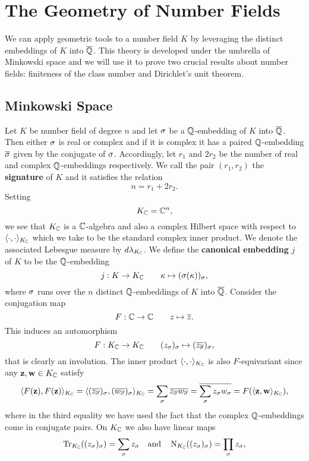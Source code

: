 \chapter{The Geometry of Number Fields}
  We can apply geometric tools to a number field $K$ by leveraging the distinct embeddings of $K$ into $\overline{\mathbb{Q}}$. This theory is developed under the umbrella of Minkowski space and we will use it to prove two crucial results about number fields: finiteness of the class number and Dirichlet's unit theorem.
  \section{Minkowski Space}
    Let $K$ be number field of degree $n$ and let $\sigma$ be a $\mathbb{Q}$-embedding of $K$ into $\overline{\mathbb{Q}}$. Then either $\sigma$ is real or complex and if it is complex it has a paired $\mathbb{Q}$-embedding $\overline{\sigma}$ given by the conjugate of $\sigma$. Accordingly, let $r_{1}$ and $2r_{2}$ be the number of real and complex $\mathbb{Q}$-embeddings respectively. We call the pair $(r_{1},r_{2})$ the \textbf{signature} of $K$ and it satisfies the relation
    \[
      n = r_{1}+2r_{2}.
    \]
    Setting
    \[
      K_{\mathbb{C}} = \mathbb{C}^{n},
    \]
    we see that $K_{\mathbb{C}}$ is a $\mathbb{C}$-algebra and also a complex Hilbert space with respect to $\langle\cdot,\cdot\rangle_{K_{\mathbb{C}}}$ which we take to be the standard complex inner product. We denote the associated Lebesgue measure by $d\lambda_{K_{\mathbb{C}}}$. We define the \textbf{canonical embedding} $j$ of $K$ to be the $\mathbb{Q}$-embedding
    \[
      j:K \to K_{\mathbb{C}} \qquad \kappa \mapsto (\sigma(\kappa))_{\sigma},
    \]
    where $\sigma$ runs over the $n$ distinct $\mathbb{Q}$-embeddings of $K$ into $\overline{\mathbb{Q}}$. Consider the conjugation map
    \[
      F:\mathbb{C} \to \mathbb{C} \qquad z \mapsto \overline{z}.
    \]
    This induces an automorphism
    \[
      F:K_{\mathbb{C}} \to K_{\mathbb{C}} \qquad (z_{\sigma})_{\sigma} \mapsto (\overline{z_{\overline{\sigma}}})_{\sigma},
    \]
    that is clearly an involution. The inner product $\langle\cdot,\cdot\rangle_{K_{\mathbb{C}}}$ is also $F$-equivariant since any $\mathbf{z},\mathbf{w} \in K_{\mathbb{C}}$ satisfy
    \[
      \langle F(\mathbf{z}),F(\mathbf{z})\rangle_{K_{\mathbb{C}}} = \langle(\overline{z_{\overline{\sigma}}})_{\sigma},(\overline{w_{\overline{\sigma}}})_{\sigma}\rangle_{K_{\mathbb{C}}} = \sum_{\sigma}\overline{z_{\overline{\sigma}}w_{\overline{\sigma}}} = \overline{\sum_{\sigma}z_{\sigma}w_{\sigma}} = F(\langle\mathbf{z},\mathbf{w}\rangle_{K_{\mathbb{C}}}),
    \]
    where in the third equality we have used the fact that the complex $\mathbb{Q}$-embeddings come in conjugate pairs. On $K_{\mathbb{C}}$ we also have linear maps
    \[
      \operatorname{\mathrm{Tr}}_{K_{\mathbb{C}}}((z_{\sigma})_{\sigma}) = \sum_{\sigma}z_{\sigma} \quad \text{and} \quad \operatorname{\mathrm{N}}_{K_{\mathbb{C}}}((z_{\sigma})_{\sigma}) = \prod_{\sigma}z_{\sigma},
    \]
